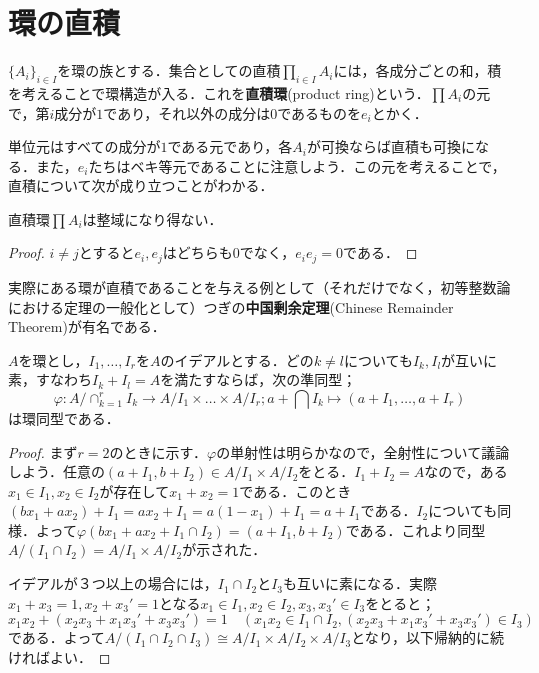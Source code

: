 \section{環の直積}

\begin{defi}[直積環]
	$\{A_i\}_{i\in I}$を環の族とする．集合としての直積$\prod_{i\in I} A_i$には，各成分ごとの和，積を考えることで環構造が入る．これを\textbf{直積環}(product ring)という．$\prod A_i$の元で，第$i$成分が$1$であり，それ以外の成分は$0$であるものを$e_i$とかく．
\end{defi}

単位元はすべての成分が$1$である元であり，各$A_i$が可換ならば直積も可換になる．また，$e_i$たちはベキ等元であることに注意しよう．この元を考えることで，直積について次が成り立つことがわかる．

\begin{prop}
	直積環$\prod A_i$は整域になり得ない．
\end{prop}

\begin{proof}
	$i\neq j$とすると$e_i,e_j$はどちらも0でなく，$e_ie_j=0$である．
\end{proof}

実際にある環が直積であることを与える例として（それだけでなく，初等整数論における定理の一般化として）つぎの\textbf{中国剰余定理}(Chinese Remainder Theorem)が有名である．

\begin{thm}[中国剰余定理]\label{thm:中国剰余定理}
	$A$を環とし，$I_1,\dots,I_r$を$A$のイデアルとする．どの$k\neq l$についても$I_k,I_l$が互いに素，すなわち$I_k+I_l=A$を満たすならば，次の準同型；
	\[\varphi:A/\cap_{k=1}^rI_k\to A/I_1\times\dots\times A/I_r;a+\bigcap I_k\mapsto (a+I_1,\dots,a+I_r)\]
	は環同型である．
\end{thm}

\begin{proof}
	まず$r=2$のときに示す．$\varphi$の単射性は明らかなので，全射性について議論しよう．任意の$(a+I_1,b+I_2)\in A/I_1\times A/I_2$をとる．$I_1+I_2=A$なので，ある$x_1\in I_1,x_2\in I_2$が存在して$x_1+x_2=1$である．このとき$(bx_1+ax_2)+I_1=ax_2+I_1=a(1-x_1)+I_1=a+I_1$である．$I_2$についても同様．よって$\varphi(bx_1+ax_2+I_1\cap I_2)=(a+I_1,b+I_2)$である．これより同型$A/(I_1\cap I_2)=A/I_1\times A/I_2$が示された．
	
	イデアルが３つ以上の場合には，$I_1\cap I_2$と$I_3$も互いに素になる．実際$x_1+x_3=1,x_2+x_3'=1$となる$x_1\in I_1,x_2\in I_2,x_3,x_3'\in I_3$をとると；
	\[x_1x_2+(x_2x_3+x_1x_3'+x_3x_3')=1\quad(x_1x_2\in I_1\cap I_2, (x_2x_3+x_1x_3'+x_3x_3')\in I_3)\]
	である．よって$A/(I_1\cap I_2\cap I_3)\cong A/I_1\times A/I_2\times A/I_3$となり，以下帰納的に続ければよい．
\end{proof}

